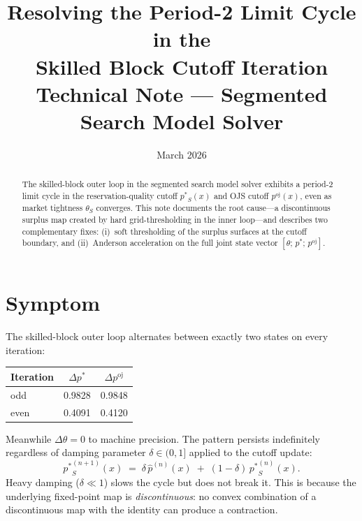 \documentclass[11pt,a4paper]{article}
\title{\textbf{Resolving the Period-2 Limit Cycle in the\\Skilled Block Cutoff Iteration}\\[0.5em]
\large Technical Note --- Segmented Search Model Solver}
\author{}
\date{March 2026}
\newcommand{\pstar}{\mathord{p^{*}}}
\newcommand{\poj}{\mathord{p^{\mathrm{oj}}}}
\theoremstyle{definition}
\begin{document}
\maketitle
\thispagestyle{empty}

\begin{abstract}
\noindent
The skilled-block outer loop in the segmented search model solver exhibits a
period-2 limit cycle in the reservation-quality cutoff $\pstar_S(x)$ and OJS
cutoff $\poj(x)$, even as market tightness $\theta_S$ converges.  This note
documents the root cause---a discontinuous surplus map created by hard
grid-thresholding in the inner loop---and describes two complementary fixes:
(i)~soft thresholding of the surplus surfaces at the cutoff boundary, and
(ii)~Anderson acceleration on the full joint state vector
$[\theta;\, \pstar;\, \poj]$.
\end{abstract}

\tableofcontents

\newpage

\section{Symptom}

The skilled-block outer loop alternates between exactly two states on every
iteration:
%
\begin{center}
\begin{tabular}{lcc}
\toprule
Iteration & $\Delta \pstar$ & $\Delta \poj$ \\
\midrule
odd  & 0.9828 & 0.9848 \\
even & 0.4091 & 0.4120 \\
\bottomrule
\end{tabular}
\end{center}
%
Meanwhile $\Delta\theta = 0$ to machine precision.  The pattern persists
indefinitely regardless of damping parameter $\delta \in (0,1]$ applied to
the cutoff update:
\[
    \pstar_S^{(n+1)}(x) \;=\; \delta\, \hat{p}^{(n)}(x)
                          \;+\; (1-\delta)\, \pstar_S^{(n)}(x).
\]
Heavy damping ($\delta \ll 1$) slows the cycle but does not break it.  This
is because the underlying fixed-point map is \emph{discontinuous}: no convex
combination of a discontinuous map with the identity can produce a
contraction.


\end{document}
